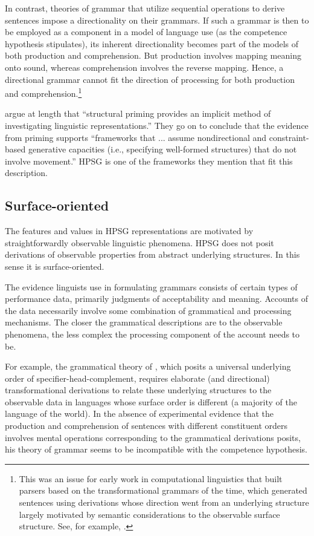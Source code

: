 \documentclass[a4paper]{article}
\begin{document}
In contrast, theories of grammar that utilize sequential operations to derive sentences impose a directionality on their grammars.  If such a grammar is then to be employed as a component in a model of language use (as the competence hypothesis stipulates), its inherent directionality becomes part of the models of both production and comprehension.  But production involves mapping meaning onto sound, whereas comprehension involves the reverse mapping.  Hence, a directional grammar cannot fit the direction of processing for both production and comprehension.\footnote{This was an issue for early work in computational linguistics that built parsers based on the transformational grammars of the time, which generated sentences using derivations whose direction went from an underlying structure largely motivated by semantic considerations to the observable surface structure.  See, for example, \citet{HobbsGrishman75}.}  

\citet{BraniganPickering2017} argue at length that ``structural priming provides an implicit method of investigating linguistic representations.''  They go on to conclude that the evidence from priming supports ``frameworks that ... assume nondirectional and constraint-based generative
capacities (i.e., specifying well-formed structures) that
do not involve movement.''  HPSG is one of the frameworks they mention that fit this description.

\subsection{Surface-oriented}

The features and values in HPSG representations are motivated by straightforwardly observable
linguistic phenomena. HPSG does not posit derivations of observable properties from abstract
underlying structures.  In this sense it is surface-oriented.

The evidence linguists use in formulating grammars consists of certain types of performance data,
primarily judgments of acceptability and meaning.  Accounts of the data necessarily involve some
combination of grammatical and processing mechanisms.  The closer the grammatical descriptions are
to the observable phenomena, the less complex the processing component of the account needs to be.

For example, the grammatical theory of \citet{Kayne94a-u}, which posits a universal underlying order of
specifier-head-complement, requires elaborate (and directional) transformational derivations to
relate these underlying structures to the observable data in languages whose surface order is
different (a majority of the language of the world).  In the absence of experimental evidence that
the production and comprehension of sentences with different constituent orders involves mental
operations corresponding to the grammatical derivations \citeauthor{Kayne94a-u} posits, his theory of grammar seems to
be incompatible with the competence hypothesis.
\end{document}
